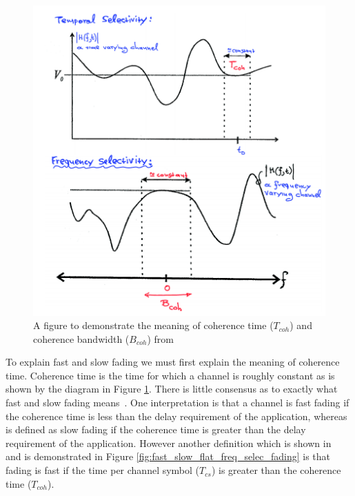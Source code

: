 \documentclass[12pt,onecolumn,letterpaper]{article}
\newcommand\genfigsize{0.5}
\begin{document}
\begin{figure}[t]
   \centering
   \includegraphics[width=\genfigsize\linewidth]{figures/time_freq_coherence.PNG}
   \caption{A figure to demonstrate the meaning of coherence time ($T_{coh}$) and coherence bandwidth ($B_{coh}$) from~\cite{EE3CommsSystemsNotesL4}}
\label{fig:coherence_illus}
\end{figure}

To explain fast and slow fading we must first explain the meaning of coherence time. Coherence time is the time for which a channel is roughly constant as is shown by the diagram in Figure \ref{fig:coherence_illus}. There is little consensus as to exactly what fast and slow fading means~\cite{WirelessTextbookC2}. One interpretation is that a channel is fast fading if the coherence time is less than the delay requirement of the application, whereas is defined as slow fading if the coherence time is greater than the delay requirement of the application. However another definition which is shown in ~\cite{EE3CommsSystemsNotesL4} and is demonstrated in Figure \ref{fig:fast_slow_flat_freq_selec_fading} is that fading is fast if the time per channel symbol ($T_{cs}$) is greater than the coherence time ($T_{coh}$).
\end{document}
